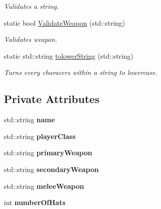 \begin{DoxyCompactItemize}
\begin{DoxyCompactList}\small\item\em Validates a string. \end{DoxyCompactList}\item 
static bool \hyperlink{class_player_adaf77c65f5dddda81b83757a9edb1901}{Validate\+Weapon} (std\+::string)
\begin{DoxyCompactList}\small\item\em Validates weapon. \end{DoxyCompactList}\item 
static std\+::string \hyperlink{class_player_a2a7318787e21ec1e69db473bee23637b}{tolower\+String} (std\+::string)
\begin{DoxyCompactList}\small\item\em Turns every characers within a string to lowercase. \end{DoxyCompactList}\end{DoxyCompactItemize}
\subsection*{Private Attributes}
\begin{DoxyCompactItemize}
\item 
\hypertarget{class_player_af9c920fabaafdeb7961a645315b521ff}{}std\+::string {\bfseries name}\label{class_player_af9c920fabaafdeb7961a645315b521ff}

\item 
\hypertarget{class_player_ae0626d499df074851372bbe2ce866473}{}std\+::string {\bfseries player\+Class}\label{class_player_ae0626d499df074851372bbe2ce866473}

\item 
\hypertarget{class_player_aa1e2ff9229bfe64551b076726c5a26e4}{}std\+::string {\bfseries primary\+Weapon}\label{class_player_aa1e2ff9229bfe64551b076726c5a26e4}

\item 
\hypertarget{class_player_accd6cd790a5bdd48269e7ecf4278d019}{}std\+::string {\bfseries secondary\+Weapon}\label{class_player_accd6cd790a5bdd48269e7ecf4278d019}

\item 
\hypertarget{class_player_adf7546769edb9c1e1166d4a63a16cce0}{}std\+::string {\bfseries melee\+Weapon}\label{class_player_adf7546769edb9c1e1166d4a63a16cce0}

\item 
\hypertarget{class_player_ab77edc66f43d9daac7b1c8f5680af313}{}int {\bfseries number\+Of\+Hats}\label{class_player_ab77edc66f43d9daac7b1c8f5680af313}

\end{DoxyCompactItemize}


